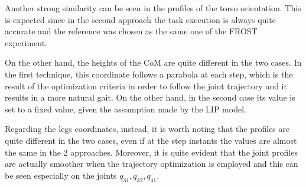 \documentclass[11pt]{article}
\begin{document}
Another strong similarity can be seen in the profiles of the torso orientation. This is expected since in the second approach the task execution is always quite accurate and the reference was chosen as the same one of the FROST experiment.

On the other hand, the heights of the CoM are quite different in the two cases. In the first technique, this coordinate follows a parabola at each step, which is the result of the optimization criteria in order to follow the joint trajectory and it results in a more natural gait. On the other hand, in the second case its value is set to a fixed value, given the assumption made by the LIP model.
 
Regarding the legs coordinates, instead, it is worth noting that the profiles are quite different in the two cases, even if at the step instants the values are almost the same in the 2 approaches. Moreover, it is quite evident that the joint profiles are actually smoother when the trajectory optimization is employed and this can be seen especially on the joints $q_{31},q_{32},q_{41}$.
\end{document}
